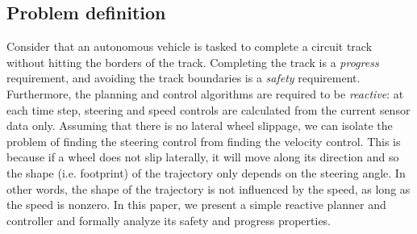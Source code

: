 \subsection{Problem definition}
Consider that an autonomous vehicle is tasked to complete a circuit track without hitting the borders of the track.
Completing the track is a \emph{progress} requirement, and avoiding the track boundaries is a \emph{safety} requirement.
%
Furthermore, the planning and control algorithms are required to be \emph{reactive}: at each time step, steering and speed controls are calculated from the current sensor data only.
%
Assuming that there is no lateral wheel slippage,
we can isolate the problem of finding the steering control from finding the velocity control.
%
This is because if a wheel does not slip laterally, it will move along its direction and so the shape (i.e. footprint) of the trajectory only depends on the steering angle.
%
In other words, the shape of the trajectory is not influenced by the speed, as long as the speed is nonzero.
%
In this paper, we present a simple reactive planner and controller and formally analyze its safety and progress properties.

